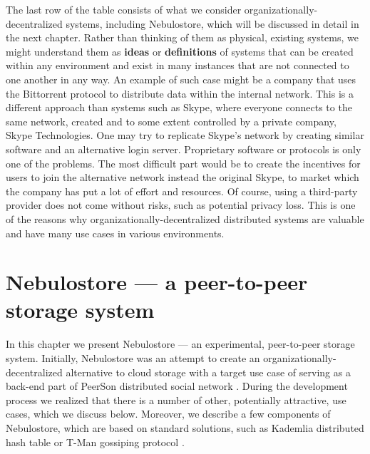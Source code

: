 \documentclass{pracamgren}
\begin{document}
The last row of the table consists of what we consider organizationally-decentralized systems, including Nebulostore, which will be discussed in detail in the next chapter. Rather than thinking of them as physical, existing systems, we might understand them as {\bf ideas} or {\bf definitions} of systems that can be created within any environment and exist in many instances that are not connected to one another in any way. An example of such case might be a company that uses the Bittorrent protocol to distribute data within the internal network. This is a different approach than systems such as Skype, where everyone connects to the same network, created and to some extent controlled by a private company, Skype Technologies. One may try to replicate Skype's network by creating similar software and an alternative login server. Proprietary software or protocols is only one of the problems. The most difficult part would be to create the incentives for users to join the alternative network instead the original Skype, to market which the company has put a lot of effort and resources. Of course, using a third-party provider does not come without risks, such as potential privacy loss. This is one of the reasons why organizationally-decentralized distributed systems are valuable and have many use cases in various environments.\\




%
%
%
%
\chapter{Nebulostore --- a peer-to-peer storage system}\label{chap::nebulo}

In this chapter we present Nebulostore --- an experimental, peer-to-peer storage system. Initially, Nebulostore was an attempt to create an organizationally-decentralized alternative to cloud storage with a target use case of serving as a back-end part of PeerSon distributed social network \cite{peerson}. During the development process we realized that there is a number of other, potentially attractive, use cases, which we discuss below. Moreover, we describe a few components of Nebulostore, which are based on standard solutions, such as Kademlia distributed hash table \cite{kademlia} or T-Man gossiping protocol \cite{tman}.\\
\end{document}
